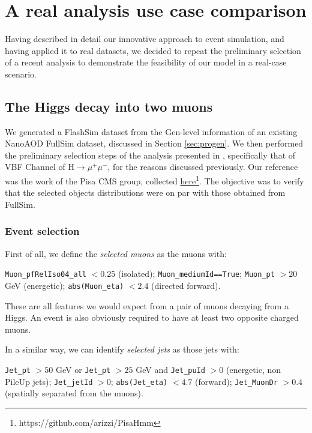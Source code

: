 \chapter{A real analysis use case comparison}\label{ch:benan} %
Having described in detail our innovative approach to event simulation, and having applied it to real datasets, we decided to repeat the preliminary selection of a recent analysis to demonstrate the feasibility of our model in a real-case scenario.

\section{The Higgs decay into two muons}
We generated a FlashSim dataset from the Gen-level information of an existing NanoAOD FullSim dataset, discussed in Section \ref{sec:progen}. We then performed the preliminary selection steps of the analysis presented in \cite{Sirunyan_2021}, specifically that of VBF Channel of H$\rightarrow\mu^+\mu^-$, for the reasons discussed previously.
Our reference was the work of the Pisa CMS group, collected \href{https://github.com/arizzi/PisaHmm}{here}\footnote{https://github.com/arizzi/PisaHmm}. The objective was to verify that the selected objects distributions were on par with those obtained from FullSim.

\subsection{Event selection}

First of all, we define the \emph{selected muons} as the muons with:
\begin{outline}
\1 \texttt{Muon\_pfRelIso04\_all} $<0.25$ (isolated);
\1  \texttt{Muon\_mediumId==True};
\1  \texttt{Muon\_pt} $>20$ GeV (energetic);
\1  \texttt{abs(Muon\_eta)} $<2.4$ (directed forward).
\end{outline}

These are all features we would expect from a pair of muons decaying from a Higgs. An event is also obviously required to have at least two opposite charged muons.

In a similar way, we can identify \emph{selected jets} as those jets with:

\begin{outline}
\1 \texttt{Jet\_pt} $> 50$ GeV or \texttt{Jet\_pt} $> 25$ GeV and \texttt{Jet\_puId} $>0$ (energetic, non PileUp jets);
\1  \texttt{Jet\_jetId} $>0$;
\1  \texttt{abs(Jet\_eta)} $<4.7$ (forward);
\1 \texttt{Jet\_MuonDr} $>0.4$ (spatially separated from the muons).
\end{outline}

